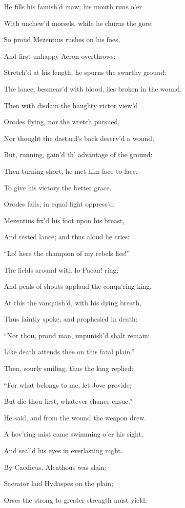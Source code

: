 He fills his famish’d maw; his mouth runs o’er

With unchew’d morsels, while he churns the gore:

So proud Mezentius rushes on his foes,

And first unhappy Acron overthrows:

Stretch’d at his length, he spurns the swarthy ground;

The lance, besmear’d with blood, lies broken in the wound.

Then with disdain the haughty victor view’d

Orodes flying, nor the wretch pursued,

Nor thought the dastard’s back deserv’d a wound,

But, running, gain’d th’ advantage of the ground:

Then turning short, he met him face to face,

To give his victory the better grace.

Orodes falls, in equal fight oppress’d:

Mezentius fix’d his foot upon his breast,

And rested lance; and thus aloud he cries:

“Lo! here the champion of my rebels lies!”

The fields around with Io Paean! ring;

And peals of shouts applaud the conqu’ring king.

At this the vanquish’d, with his dying breath,

Thus faintly spoke, and prophesied in death:

“Nor thou, proud man, unpunish’d shalt remain:

Like death attends thee on this fatal plain.”

Then, sourly smiling, thus the king replied:

“For what belongs to me, let Jove provide;

But die thou first, whatever chance ensue.”

He said, and from the wound the weapon drew.

A hov’ring mist came swimming o’er his sight,

And seal’d his eyes in everlasting night.

By Caedicus, Alcathous was slain;

Sacrator laid Hydaspes on the plain;

Orses the strong to greater strength must yield;

